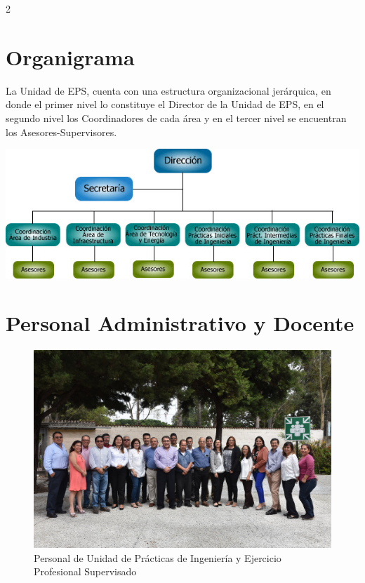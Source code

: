 \documentclass[11pt,spanish,Letterpaper,openany]{book}
\begin{document}
\begin {multicols}{2}
\hypertarget{organigrama}{%
\section*{Organigrama}\label{organigrama}}

La Unidad de EPS, cuenta con una estructura organizacional jerárquica, en donde el primer nivel lo constituye el Director de la Unidad de EPS, en el segundo nivel los Coordinadores de cada área y en el tercer nivel se encuentran los Asesores-Supervisores.
\bigskip

\begin {flushleft}

\noindent\begin{minipage}[c]{\columnwidth}

\includegraphics[width=1\linewidth]{images/201901-unidadeps-imagen01}

\end{minipage}

\end {flushleft}

\bigskip

\end {multicols}

\hypertarget{personal-administrativo-y-docente}{%
\section*{Personal Administrativo y Docente}\label{personal-administrativo-y-docente}}

\begin{figure}[H]

{\centering \includegraphics[width=0.67\linewidth]{images/201901-unidadeps-imagen02} 

}

\caption{Personal de Unidad de Prácticas de Ingeniería y Ejercicio Profesional Supervisado}\label{fig:unnamed-chunk-7}
\end{figure}
\end{document}
